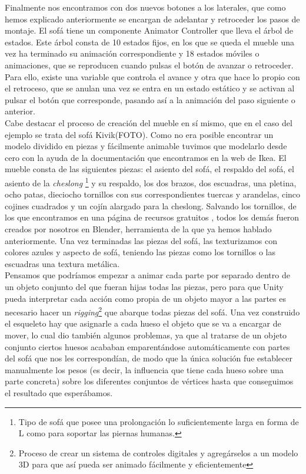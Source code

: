 Finalmente nos encontramos con dos nuevos botones a los laterales, que como hemos explicado anteriormente se encargan de adelantar y retroceder los pasos de montaje. El sofá tiene un componente Animator Controller que lleva el árbol de estados. Este árbol consta de 10 estados fijos, en los que se queda el mueble una vez ha terminado su animación correspondiente y 18 estados móviles o animaciones, que se reproducen cuando pulsas el botón de avanzar o retroceder. Para ello, existe una variable que controla el avance y otra que hace lo propio con el retroceso, que se anulan una vez se entra en un estado estático y se activan al pulsar el botón que corresponde, pasando así a la animación del paso siguiente o anterior.\\

Cabe destacar el proceso de creación del mueble en sí mismo, que en el caso del ejemplo se trata del sofá Kivik(FOTO). Como no era posible encontrar un modelo dividido en piezas y fácilmente animable tuvimos que modelarlo desde cero con la ayuda de la documentación que encontramos en la web de Ikea. El mueble consta de las siguientes piezas: el asiento del sofá, el respaldo del sofá, el asiento de la \textit{cheslong} \footnote{ Tipo de sofá que posee una prolongación lo suficientemente larga en forma de L como para soportar las piernas humanas.} y su respaldo, los dos brazos, dos escuadras, una pletina, ocho patas, dieciocho tornillos con sus correspondientes tuercas y arandelas, cinco cojines cuadrados y un cojín alargado para la cheslong. Salvando los tornillos, de los que encontramos en una página de recursos gratuitos \cite{tornillos}, todos los demás fueron creados por nosotros en Blender, herramienta de la que ya hemos hablado anteriormente. Una vez terminadas las piezas del sofá, las texturizamos con colores azules y aspecto de sofá, teniendo las piezas como los tornillos o las escuadras una textura metálica.\\

Pensamos que podríamos empezar a animar cada parte por separado dentro de un objeto conjunto del que fueran hijas todas las piezas, pero para que Unity pueda interpretar cada acción como propia de un objeto mayor a las partes es necesario hacer un \textit{rigging}\footnote{ Proceso de crear un sistema de controles digitales y agregárselos a un modelo 3D para que así pueda ser animado fácilmente y eficientemente} que abarque todas piezas del sofá. Una vez construido el esqueleto hay que asignarle a cada hueso el objeto que se va a encargar de mover, lo cual dio también algunos problemas, ya que al tratarse de un objeto conjunto ciertos huesos acababan emparentándose automáticamente con partes del sofá que nos les correspondían, de modo que la única solución fue establecer manualmente los pesos (es decir, la influencia que tiene cada hueso sobre una parte concreta) sobre los diferentes conjuntos de vértices hasta que conseguimos el resultado que esperábamos.\\

